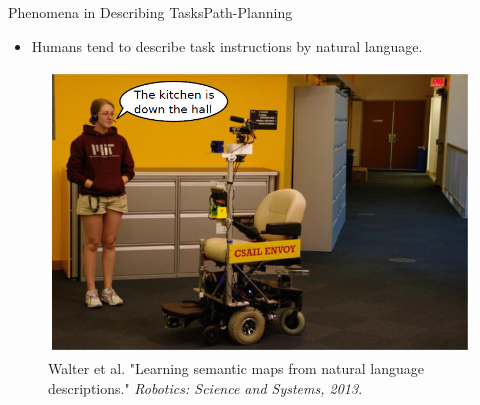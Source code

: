 \begin{frame}{Phenomena in Describing Tasks}{Path-Planning}

\begin{block}{}
\begin{itemize}
\item Humans tend to describe task instructions by natural language.\footnotemark
\end{itemize}
\end{block}

\begin{figure}
	\centering
	\includegraphics[width=.6\linewidth]{figure/natural_language}
	\caption{ \tiny{ Walter et al. "Learning semantic maps from natural language descriptions." {\it Robotics: Science and Systems, 2013}.} }
\end{figure}


\end{frame}

